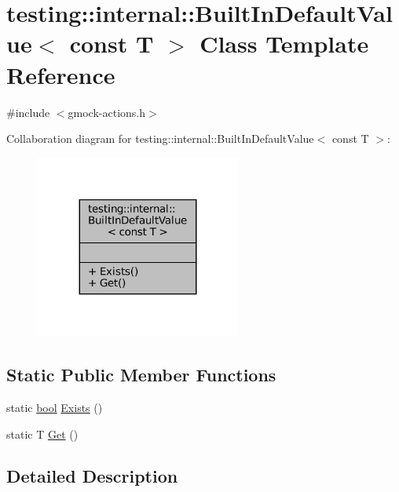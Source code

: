 \hypertarget{classtesting_1_1internal_1_1BuiltInDefaultValue_3_01const_01T_01_4}{}\section{testing\+:\+:internal\+:\+:Built\+In\+Default\+Value$<$ const T $>$ Class Template Reference}
\label{classtesting_1_1internal_1_1BuiltInDefaultValue_3_01const_01T_01_4}


{\ttfamily \#include $<$gmock-\/actions.\+h$>$}



Collaboration diagram for testing\+:\+:internal\+:\+:Built\+In\+Default\+Value$<$ const T $>$\+:
\nopagebreak
\begin{figure}[H]
\begin{center}
\leavevmode
\includegraphics[width=191pt]{classtesting_1_1internal_1_1BuiltInDefaultValue_3_01const_01T_01_4__coll__graph}
\end{center}
\end{figure}
\subsection*{Static Public Member Functions}
\begin{DoxyCompactItemize}
\item 
static \hyperlink{classbool}{bool} \hyperlink{classtesting_1_1internal_1_1BuiltInDefaultValue_3_01const_01T_01_4_a1814803ec5dcc660ee1f1092a96b79fa}{Exists} ()
\item 
static T \hyperlink{classtesting_1_1internal_1_1BuiltInDefaultValue_3_01const_01T_01_4_a5996754952ecbcc5da77a2cebd4722de}{Get} ()
\end{DoxyCompactItemize}


\subsection{Detailed Description}
